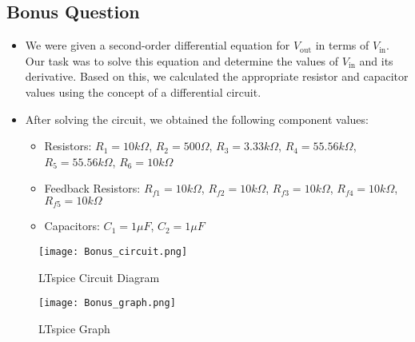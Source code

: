 \documentclass[9pt,conference]{IEEEtran}
\begin{document}
\subsection{Bonus Question}
\begin{itemize}
    \item We were given a second-order differential equation for \( V_{\text{out}} \) in terms of \( V_{\text{in}} \). Our task was to solve this equation and determine the values of \( V_{\text{in}} \) and its derivative. Based on this, we calculated the appropriate resistor and capacitor values using the concept of a differential circuit.
    \item After solving the circuit, we obtained the following component values:
    \begin{itemize}
        \item Resistors:  
        \( R_1 = 10k\Omega \), \( R_2 = 500\Omega \), \( R_3 = 3.33k\Omega \),  
        \( R_4 = 55.56k\Omega \), \( R_5 = 55.56k\Omega \), \( R_6 = 10k\Omega \)
        \item Feedback Resistors:  
        \( R_{f1} = 10k\Omega \), \( R_{f2} = 10k\Omega \),  
        \( R_{f3} = 10k\Omega \), \( R_{f4} = 10k\Omega \), \( R_{f5} = 10k\Omega \)
        \item Capacitors:  
        \( C_1 = 1\mu F \), \( C_2 = 1\mu F \)
    \end{itemize}
\end{itemize}
\begin{figure}[H]
    \centering
    \texttt{[image: Bonus\_circuit.png]}
    \caption{LTspice Circuit Diagram}
    \label{fig:positive_clamper}
\end{figure}
\begin{figure}[H]
    \centering
    \texttt{[image: Bonus\_graph.png]}
    \caption{LTspice Graph}
    \label{fig:positive_clamper}
\end{figure}
\end{document}
